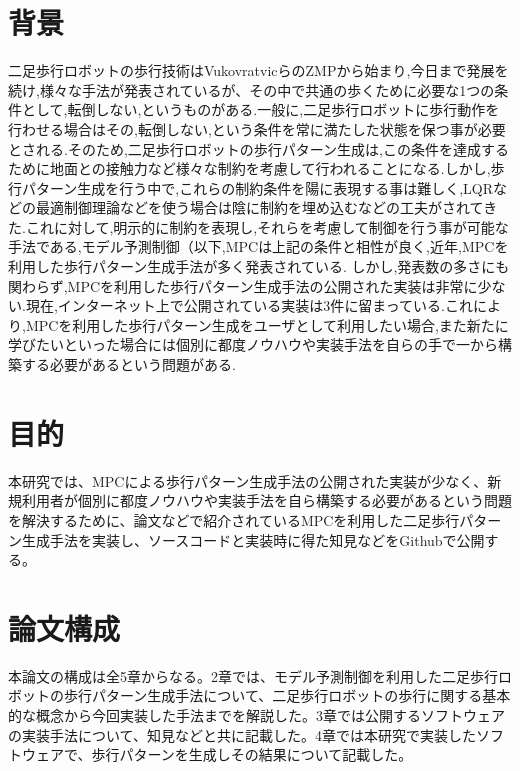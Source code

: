 
\section{背景}
二足歩行ロボットの歩行技術はVukovratvicらのZMP\cite{VUKOBRATOVIC19721}から始まり,今日まで発展を続け,様々な手法が発表されているが、その中で共通の歩くために必要な1つの条件として,転倒しない,というものがある.一般に,二足歩行ロボットに歩行動作を行わせる場合はその,転倒しない,という条件を常に満たした状態を保つ事が必要とされる.そのため,二足歩行ロボットの歩行パターン生成は,この条件を達成するために地面との接触力など様々な制約を考慮して行われることになる.しかし,歩行パターン生成を行う中で,これらの制約条件を陽に表現する事は難しく,LQRなどの最適制御理論などを使う場合は陰に制約を埋め込むなどの工夫がされてきた.これに対して,明示的に制約を表現し,それらを考慮して制御を行う事が可能な手法である,モデル予測制御（以下,MPC\cite{MPC}は上記の条件と相性が良く,近年,MPCを利用した歩行パターン生成手法が多く発表されている.
しかし,発表数の多さにも関わらず,MPCを利用した歩行パターン生成手法の公開された実装は非常に少ない.現在,インターネット上で公開されている実装は3件\cite{GITHUB1}\cite{GITHUB2}\cite{GITHUB3}に留まっている.これにより,MPCを利用した歩行パターン生成をユーザとして利用したい場合,また新たに学びたいといった場合には個別に都度ノウハウや実装手法を自らの手で一から構築する必要があるという問題がある.

\section{目的}
本研究では、MPCによる歩行パターン生成手法の公開された実装が少なく、新規利用者が個別に都度ノウハウや実装手法を自ら構築する必要があるという問題を解決するために、論文などで紹介されているMPCを利用した二足歩行パターン生成手法を実装し、ソースコードと実装時に得た知見などをGithub\cite{MYGITHUB}で公開する。

\section{論文構成}
本論文の構成は全5章からなる。2章では、モデル予測制御を利用した二足歩行ロボットの歩行パターン生成手法について、二足歩行ロボットの歩行に関する基本的な概念から今回実装した手法までを解説した。3章では公開するソフトウェアの実装手法について、知見などと共に記載した。4章では本研究で実装したソフトウェアで、歩行パターンを生成しその結果について記載した。


\newpage
